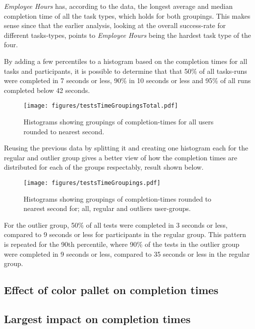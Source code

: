     \textit{Employee Hours} has, according to the data, the longest average
    and median completion time of all the task types, which holds for both
    groupings. This makes sense since that the earlier analysis, looking at
    the overall success-rate for different tasks-types, points to
    \textit{Employee Hours} being the hardest task type of the four.

    By adding a few percentiles to a histogram based on the completion times for all
    tasks and participants, it is possible to determine that that 50\% of
    all tasks-runs were completed in 7 seconds or less, 90\% in 10 seconds
    or less and 95\% of all runs completed below 42 seconds.

    \begin{figure}[h!]
      \centering
      \texttt{[image: figures/testsTimeGroupingsTotal.pdf]}
      \caption{
        Histograms showing groupings of completion-times for all users
        rounded to nearest second.
      }
    \end{figure}

    Reusing the previous data by splitting it and creating one histogram
    each for the regular and outlier group gives a better view of how the
    completion times are distributed for each of the groups respectably,
    result shown below.

    \begin{figure}[h!]
      \centering
      \texttt{[image: figures/testsTimeGroupings.pdf]}
      \caption{
        Histograms showing groupings of completion-times rounded to nearest
        second for; all, regular and outliers user-groups.
      }
    \end{figure}

    For the outlier group, 50\% of all tests were completed in 3 seconds or
    less, compared to 9 seconds or less for participants in the regular
    group. This pattern is repeated for the 90th percentile, where 90\% of
    the tests in the outlier group were completed in 9 seconds or less,
    compared to 35 seconds or less in the regular group.

  \subsection{Effect of color pallet on completion times}


  \subsection{Largest impact on completion times}


